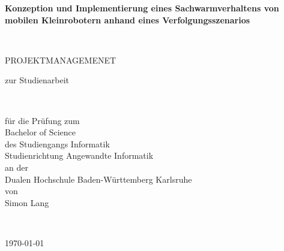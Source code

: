 	\pagestyle{scrheadings}
	\clearscrheadfoot
	\begin{verbatim}
	\end{verbatim}
	\begin{center}
		\large{\textbf{Konzeption und Implementierung eines Sachwarmverhaltens von mobilen Kleinrobotern anhand eines Verfolgungsszenarios}}
	\end{center}
	\begin{verbatim}
		
	\end{verbatim}
	\begin{center}
		\large{PROJEKTMANAGEMENET}
	\end{center}
	\begin{center}
		\large{zur Studienarbeit}
	\end{center}
	\begin{verbatim}
		
	\end{verbatim}
	\begin{center}
		für die Prüfung zum\\
		\medskip
		Bachelor of Science\\
		\medskip
		des Studiengangs Informatik\\
		Studienrichtung Angewandte Informatik\\
		\medskip
		an der\\
		\medskip
		Dualen Hochschule Baden-Württemberg Karlsruhe\\
		\bigskip
		von\\
		\bigskip
		Simon Lang
	\end{center}
	\begin{verbatim}
		
	\end{verbatim}
	\begin{center}
		\today
	\end{center}
